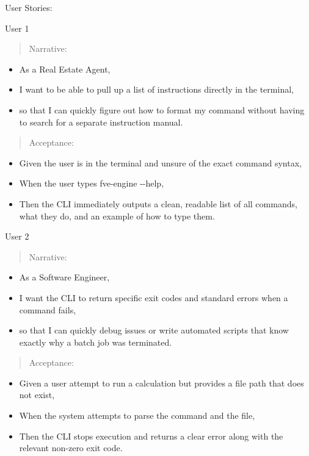 \documentclass[
]{article}
\begin{document}
User Stories:

User 1

\begin{quote}
Narrative:
\end{quote}

\begin{itemize}
\item
  As a Real Estate Agent,
\item
  I want to be able to pull up a list of instructions directly in the
  terminal,
\item
  so that I can quickly figure out how to format my command without
  having to search for a separate instruction manual.
\end{itemize}

\begin{quote}
Acceptance:
\end{quote}

\begin{itemize}
\item
  Given the user is in the terminal and unsure of the exact command
  syntax,
\item
  When the user types fve-engine -\/-help,
\item
  Then the CLI immediately outputs a clean, readable list of all
  commands, what they do, and an example of how to type them.
\end{itemize}

User 2

\begin{quote}
Narrative:
\end{quote}

\begin{itemize}
\item
  As a Software Engineer,
\item
  I want the CLI to return specific exit codes and standard errors when
  a command fails,
\item
  so that I can quickly debug issues or write automated scripts that
  know exactly why a batch job was terminated.
\end{itemize}

\begin{quote}
Acceptance:
\end{quote}

\begin{itemize}
\item
  Given a user attempt to run a calculation but provides a file path
  that does not exist,
\item
  When the system attempts to parse the command and the file,
\item
  Then the CLI stops execution and returns a clear error along with the
  relevant non-zero exit code.
\end{itemize}
\end{document}
